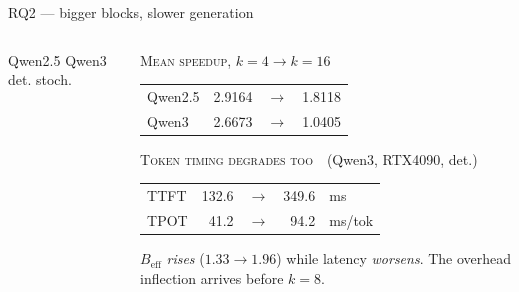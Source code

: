 \documentclass[aspectratio=169, 11pt]{beamer}
\begin{document}
\begin{frame}{RQ2 --- bigger blocks, slower generation}
  \begin{columns}[T,onlytextwidth]
    \begin{column}{0.53\textwidth}
      \vskip2pt
      \chartFamilies{3.3cm}
      \vskip2pt
      {\centering
       {\scriptsize\color{ink2}Qwen2.5}\quad
       {\scriptsize\color{ink2}Qwen3}\quad
       {\scriptsize\color{ink2}det.}\quad
       {\scriptsize\color{ink2}stoch.}\par}
    \end{column}
    \begin{column}{0.44\textwidth}
      {\footnotesize\color{ink2}\textsc{Mean speedup, $k{=}4 \to k{=}16$}}\par
      \vskip4pt
      {\small\begin{tabular}{@{}l@{\hskip 8pt}N@{\ }l@{\ }N@{}}
        Qwen2.5 & 2.9164 & $\to$ & 1.8118\\
        Qwen3   & 2.6673 & $\to$ & 1.0405\\
      \end{tabular}}
      \vskip10pt
      {\footnotesize\color{ink2}\textsc{Token timing degrades too}\ \
      \tiny(Qwen3, RTX4090, det.)}\par
      \vskip4pt
      {\small\begin{tabular}{@{}l@{\hskip 8pt}N@{\ }l@{\ }N@{\ }l@{}}
        TTFT & 132.6 & $\to$ & 349.6 & ms\\
        TPOT & 41.2  & $\to$ & 94.2  & ms/tok\\
      \end{tabular}}
      \vskip10pt
      \begin{takeawaywarm}
        $B_{\text{eff}}$ \emph{rises} ($1.33 \to 1.96$) while latency
        \emph{worsens}. The overhead inflection arrives \alert{before $k{=}8$}.
      \end{takeawaywarm}
    \end{column}
  \end{columns}
\end{frame}
\end{document}
